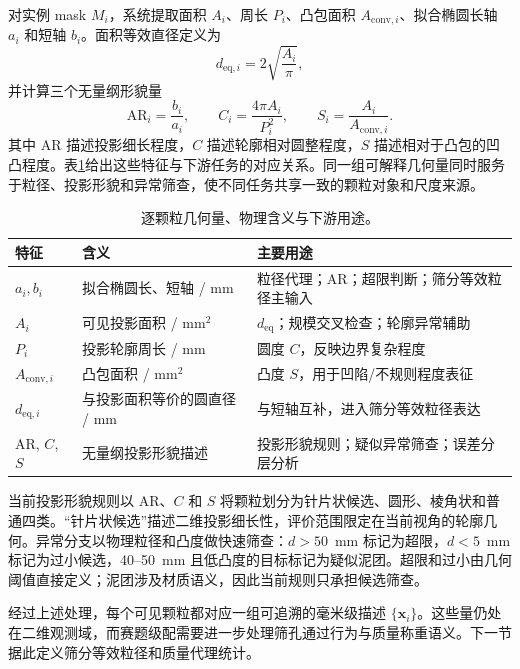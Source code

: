 对实例 mask $M_i$，系统提取面积 $A_i$、周长 $P_i$、凸包面积 $A_{\mathrm{conv},i}$、拟合椭圆长轴 $a_i$ 和短轴 $b_i$。面积等效直径定义为
\begin{equation}
 d_{\mathrm{eq},i}=2\sqrt{\frac{A_i}{\pi}},
\label{eq:r-deq}
\end{equation}
并计算三个无量纲形貌量
\begin{equation}
 \mathrm{AR}_i=\frac{b_i}{a_i},\qquad
 C_i=\frac{4\pi A_i}{P_i^2},\qquad
 S_i=\frac{A_i}{A_{\mathrm{conv},i}}.
\label{eq:r-shape}
\end{equation}
其中 AR 描述投影细长程度，$C$ 描述轮廓相对圆整程度，$S$ 描述相对于凸包的凹凸程度。表\ref{tab:r-features}给出这些特征与下游任务的对应关系。同一组可解释几何量同时服务于粒径、投影形貌和异常筛查，使不同任务共享一致的颗粒对象和尺度来源。

\begin{table}[t]
\centering
\caption{逐颗粒几何量、物理含义与下游用途。}
\label{tab:r-features}
\footnotesize
\renewcommand{\arraystretch}{1.12}
\begin{tabular}{>{\centering\arraybackslash}p{2.0cm}>{\raggedright\arraybackslash}p{4.5cm}>{\raggedright\arraybackslash}p{7.0cm}}
\toprule
特征 & 含义 & 主要用途 \\
\midrule
$a_i,b_i$ & 拟合椭圆长、短轴 / mm & 粒径代理；AR；超限判断；筛分等效粒径主输入 \\
$A_i$ & 可见投影面积 / mm$^2$ & $d_{\mathrm{eq}}$；规模交叉检查；轮廓异常辅助 \\
$P_i$ & 投影轮廓周长 / mm & 圆度 $C$，反映边界复杂程度 \\
$A_{\mathrm{conv},i}$ & 凸包面积 / mm$^2$ & 凸度 $S$，用于凹陷/不规则程度表征 \\
$d_{\mathrm{eq},i}$ & 与投影面积等价的圆直径 / mm & 与短轴互补，进入筛分等效粒径表达 \\
AR, $C$, $S$ & 无量纲投影形貌描述 & 投影形貌规则；疑似异常筛查；误差分层分析 \\
\bottomrule
\end{tabular}
\end{table}

当前投影形貌规则以 AR、$C$ 和 $S$ 将颗粒划分为针片状候选、圆形、棱角状和普通四类。“针片状候选”描述二维投影细长性，评价范围限定在当前视角的轮廓几何。异常分支以物理粒径和凸度做快速筛查：$d>50$~mm 标记为超限，$d<5$~mm 标记为过小候选，40--50~mm 且低凸度的目标标记为疑似泥团。超限和过小由几何阈值直接定义；泥团涉及材质语义，因此当前规则只承担候选筛查。

经过上述处理，每个可见颗粒都对应一组可追溯的毫米级描述 $\{\mathbf{x}_i\}$。这些量仍处在二维观测域，而赛题级配需要进一步处理筛孔通过行为与质量称重语义。下一节据此定义筛分等效粒径和质量代理统计。
